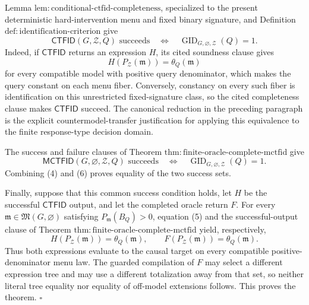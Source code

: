 Lemma \(\mathrm{lem:conditional\text{-}ctfid\text{-}completeness}\), specialized to the present deterministic hard-intervention menu and fixed binary signature, and Definition \(\mathrm{def:identification\text{-}criterion}\) give
\[
 \mathsf{CTFID}(G,\mathcal Z,Q)\text{ succeeds}
 \quad\Longleftrightarrow\quad
 \operatorname{GID}_{G,\varnothing,\mathcal Z}(Q)=1.
\tag{4}
\]
Indeed, if \(\mathsf{CTFID}\) returns an expression \(H\), its cited soundness clause gives
\[
 H(P_{\mathcal Z}(\mathfrak m))=\theta_Q(\mathfrak m)
\tag{5}
\]
for every compatible model with positive query denominator, which makes the query constant on each menu fiber.  Conversely, constancy on every such fiber is identification on this unrestricted fixed-signature class, so the cited completeness clause makes \(\mathsf{CTFID}\) succeed.  The canonical reduction in the preceding paragraph is the explicit countermodel-transfer justification for applying this equivalence to the finite response-type decision domain.

The success and failure clauses of Theorem \(\mathrm{thm:finite\text{-}oracle\text{-}complete\text{-}mctfid}\) give
\[
 \mathsf{MCTFID}(G,\varnothing,\mathcal Z,Q)\text{ succeeds}
 \quad\Longleftrightarrow\quad
 \operatorname{GID}_{G,\varnothing,\mathcal Z}(Q)=1.
\tag{6}
\]
Combining (4) and (6) proves equality of the two success sets.

Finally, suppose that this common success condition holds, let \(H\) be the successful \(\mathsf{CTFID}\) output, and let the completed oracle return \(F\).  For every \(\mathfrak m\in\mathfrak M(G,\varnothing)\) satisfying \(P_{\mathfrak m}(B_Q)>0\), equation (5) and the successful-output clause of Theorem \(\mathrm{thm:finite\text{-}oracle\text{-}complete\text{-}mctfid}\) yield, respectively,
\[
 H(P_{\mathcal Z}(\mathfrak m))=\theta_Q(\mathfrak m),
 \qquad
 F(P_{\mathcal Z}(\mathfrak m))=\theta_Q(\mathfrak m).
\]
Thus both expressions evaluate to the causal target on every compatible positive-denominator menu law.  The guarded compilation of \(F\) may select a different expression tree and may use a different totalization away from that set, so neither literal tree equality nor equality of off-model extensions follows.  This proves the theorem. \(\square\)